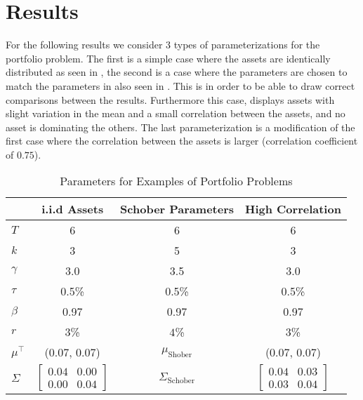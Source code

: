 \documentclass[11pt]{article}
\begin{document}
\fi

\section{Results} \label{Section: Results}
For the following results we consider 3 types of parameterizations for the portfolio problem.
The first is a simple case where the assets are identically distributed as seen in \autocite{CaiJuddXu2013},
the second is a case where the parameters are chosen to match the parameters in \autocite{Schober2022} also seen in \autocite{Scheidegger2023}.
This is in order to be able to draw correct comparisons between the results. Furthermore this case,
displays assets with slight variation in the mean and a small correlation between the assets, and no asset is dominating the others.
The last parameterization is a modification of the first case where the correlation between the assets is larger (correlation coefficient of $0.75$).
\begin{table}[!ht]
    \label{table: Parameters_Base_Models}
    \centering
    \caption{Parameters for Examples of Portfolio Problems}
    \begin{tabular}{lccc}
    \toprule
    & \textbf{i.i.d Assets} & \textbf{Schober Parameters} & \textbf{High Correlation} \\
    \midrule
    $T$        & 6                & 6                & 6                \\
    $k$        & 3                & 5                & 3                \\
    $\gamma$   & 3.0              & 3.5              & 3.0              \\
    $\tau$     & 0.5\%            & 0.5\%            & 0.5\%            \\
    $\beta$    & 0.97             & 0.97             & 0.97             \\
    $r$        & $3$\% & $4$\%    &  $3$\% \\
    $\mu^\top$ & (0.07, 0.07) & $\mu_{\text{Shober}}$ & (0.07, 0.07) \\
    $\Sigma$   & 
    $\begin{bmatrix}
    0.04 & 0.00 \\
    0.00 & 0.04
    \end{bmatrix}$
    & $\Sigma_{\text{Schober}}$ 
    & 
    $\begin{bmatrix}
    0.04 & 0.03\\
    0.03 & 0.04
    \end{bmatrix}$ \\
    \bottomrule
    \end{tabular}
\end{table}
\end{document}
